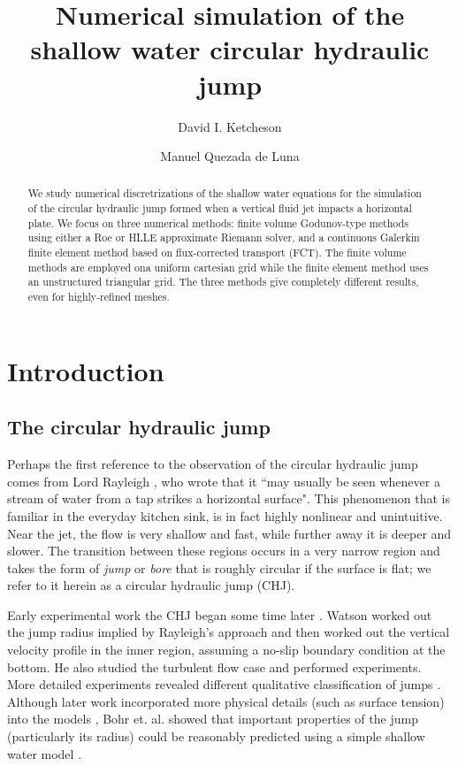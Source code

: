 \documentclass{article}
\title{Numerical simulation of the shallow water circular hydraulic jump}
\author{
    David I. Ketcheson \and
    Manuel Quezada de Luna
}
\begin{document}
\maketitle

\begin{abstract}
We study numerical discretrizations of the shallow water equations
for the simulation of the circular hydraulic jump formed
when a vertical fluid jet impacts a horizontal plate.  
We focus on three numerical methods: finite volume Godunov-type
methods using either a Roe or HLLE approximate Riemann solver, and
a continuous Galerkin finite element method based on flux-corrected transport (FCT).
The finite volume methods are employed ona uniform cartesian grid
while the finite element method uses an unstructured triangular grid.
The three methods give completely different results, even for
highly-refined meshes.
\end{abstract}


\section{Introduction}

\subsection{The circular hydraulic jump}

Perhaps the first reference to the observation of the circular hydraulic jump
comes from Lord Rayleigh \cite{rayleigh1914theory}, who wrote that it
``may usually be seen whenever a stream of water from a tap strikes a horizontal
surface".  This phenomenon that is familiar in the everyday kitchen sink, is in
fact highly nonlinear and unintuitive.  Near the jet, the flow is very shallow and
fast, while further away it is deeper and slower.  The transition between these regions
occurs in a very narrow region and takes the form of \emph{jump} or \emph{bore}
that is roughly circular if the surface is flat; we refer to it herein as a
circular hydraulic jump (CHJ).

Early experimental work the CHJ began some time later
\cite{kurihara1946hydraulic,tani1949water,watson1964radial}.
Watson \cite{watson1964radial} worked out the jump radius
implied by Rayleigh's approach and then worked out the vertical
velocity profile in the inner region, assuming a no-slip
boundary condition at the bottom.  He also studied the turbulent
flow case and performed experiments.
More detailed experiments revealed different qualitative classification
of jumps  \cite{ishigai1977heat,craik1981circular}.
Although later work incorporated more physical details (such as surface tension) into the models
\cite{bush2003influence}, Bohr et. al. showed that important properties of the jump
(particularly its radius) could be reasonably predicted using a simple shallow water
model \cite{bohr1993shallow}.
\end{document}
